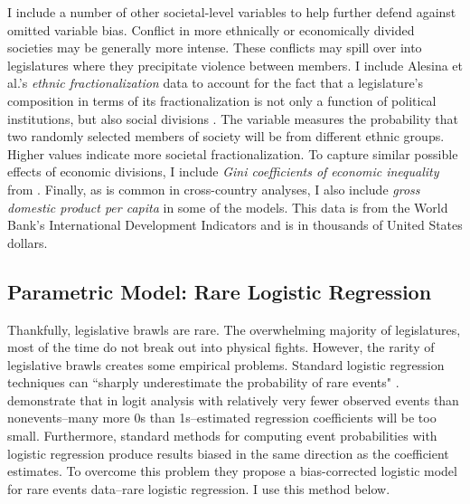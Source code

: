 \documentclass[a4paper]{article}\usepackage{graphicx, color}
\begin{document}
I include a number of other societal-level variables to help further defend against omitted variable bias. Conflict in more ethnically or economically divided societies may be generally more intense. These conflicts may spill over into legislatures where they precipitate violence between members. I include Alesina et al.'s \citeyearpar{Alesina2003} {\emph{ethnic fractionalization}} data to account for the fact that a legislature's composition in terms of its fractionalization is not only a function of political institutions, but also social divisions \citep{Neto1997, Mozaffar2003}. The variable measures the probability that two randomly selected members of society will be from different ethnic groups. Higher values indicate more societal fractionalization. To capture similar possible effects of economic divisions, I include {\emph{Gini coefficients of economic inequality}} from \cite{UNU2008}. Finally, as is common in cross-country analyses, I also include {\emph{gross domestic product per capita}} in some of the models. This data is from the World Bank's International Development Indicators \citeyearpar{WorldBank2011} and is in thousands of United States dollars.

\subsection{Parametric Model: Rare Logistic Regression}

Thankfully, legislative brawls are rare. The overwhelming majority of legislatures, most of the time do not break out into physical fights. However, the rarity of legislative brawls creates some empirical problems. Standard logistic regression techniques can ``sharply underestimate the probability of rare events" \cite[137]{KingRareEventsPA2001}. \cite{KingRareEventsPA2001} demonstrate that in logit analysis with relatively very fewer observed events than nonevents--many more 0s than 1s--estimated regression coefficients will be too small. Furthermore, standard methods for computing event probabilities with logistic regression produce results biased in the same direction as the coefficient estimates. To overcome this problem they propose a bias-corrected logistic model for rare events data--rare logistic regression. I use this method below.
\end{document}

